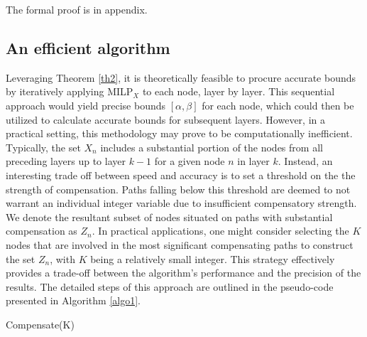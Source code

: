 \smallskip
The formal proof is in appendix.


\subsection{An efficient algorithm}


Leveraging Theorem \ref{th2}, it is theoretically feasible to procure accurate bounds by iteratively applying MILP$_{X}$ to each node, layer by layer. This sequential approach would yield precise bounds $[\alpha,\beta]$ for each node, which could then be utilized to calculate accurate bounds for subsequent layers. However, in a practical setting, this methodology may prove to be computationally inefficient. Typically, the set $X_n$ includes a substantial portion of the nodes from all preceding layers up to layer $k-1$ for a given node $n$ in layer $k$. Instead, an interesting trade off between speed and accuracy is to set a threshold on the the strength of compensation. Paths falling below this threshold are deemed to not warrant an individual integer variable due to insufficient compensatory strength. We denote the resultant subset of nodes situated on paths with substantial compensation as $Z_n$. In practical applications, one might consider selecting the $K$ nodes that are involved in the most significant compensating paths to construct the set $Z_n$, with $K$ being a relatively small integer. This strategy effectively provides a trade-off between the algorithm's performance and the precision of the results. The detailed steps of this approach are outlined in the pseudo-code presented in Algorithm \ref{algo1}.






\begin{algorithm}[htb]
	\caption{Compensate(K)}
	\label{algo1}
	
	
\end{algorithm}	




